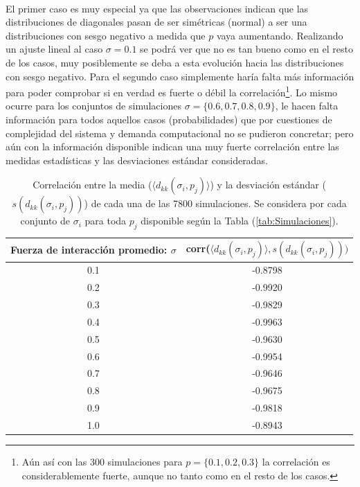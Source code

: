 \documentclass[a4paper,11pt]{book}
\theoremstyle{plain}
\theoremstyle{definition}
\begin{document}
\\
El primer caso es muy especial ya que las observaciones indican que las distribuciones de diagonales pasan de ser simétricas (normal) a ser una distribuciones con sesgo negativo a medida que $p$ vaya aumentando. Realizando un ajuste lineal al caso $\sigma=0.1$ se podrá ver que no es tan bueno como en el resto de los casos, muy posiblemente se deba a esta evolución hacia las distribuciones con sesgo negativo. Para el segundo caso simplemente haría falta más información para poder comprobar si en verdad es fuerte o débil la correlación\footnote{Aún así con las 300 simulaciones para $p=\{0.1,0.2,0.3\}$ la correlación es considerablemente fuerte, aunque no tanto como en el resto de los casos.}. Lo mismo ocurre para los conjuntos de simulaciones $\sigma=\{0.6,0.7,0.8,0.9\}$, le hacen falta información para todos aquellos casos (probabilidades) que por cuestiones de complejidad del sistema y demanda computacional no se pudieron concretar; pero aún con la información disponible indican una muy fuerte correlación entre las medidas estadísticas y las desviaciones estándar consideradas. 
\begin{table}[h!]
	\centering
	\begin{tabular}{|c|c|}
		\hline
		Fuerza de interacción promedio: $\sigma$ & corr($\langle d_{kk}(\sigma_i,p_j)\rangle,s(d_{kk}(\sigma_i,p_j)))$ \\ \hline
		0.1 & -0.8798 \\ \hline
		0.2 & -0.9920\\ \hline
		0.3 & -0.9829 \\ \hline
		0.4 & -0.9963\\ \hline
		0.5 & -0.9630 \\ \hline
		0.6 & -0.9954 \\ \hline
		0.7 & -0.9646 \\ \hline
		0.8 & -0.9675 \\ \hline
		0.9 & -0.9818 \\ \hline
		1.0 & -0.8943 \\ \hline
	\end{tabular}
	\caption{Correlación entre la media ($\langle d_{kk}(\sigma_i,p_j)\rangle$) y la desviación estándar ($s(d_{kk}(\sigma_i,p_j))$) de cada una de las 7800 simulaciones. Se considera por cada conjunto de $\sigma_i$ para toda $p_j$ disponible según la Tabla (\ref{tab:Simulaciones}).}
	\label{tab:Correlaciones}
\end{table} 
\end{document}
